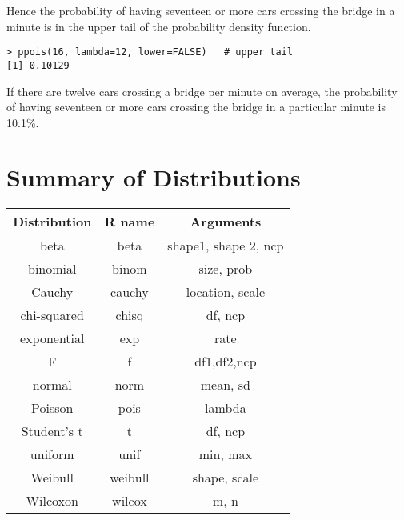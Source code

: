 Hence the probability of having seventeen or more cars crossing the bridge in a minute is in the upper tail of the probability density function. 
\begin{verbatim}
> ppois(16, lambda=12, lower=FALSE)   # upper tail 
[1] 0.10129 
\end{verbatim}

If there are twelve cars crossing a bridge per minute on average, the probability of having seventeen or more cars crossing the bridge in a particular minute is 10.1\%. 







\section{Summary of Distributions}
\begin{center}
\begin{tabular}{|c|c|c|}
\hline
Distribution &	R name & Arguments\\ \hline
beta &	beta &	shape1, shape 2, ncp\\
binomial &	binom	& size, prob\\
Cauchy	& cauchy	& location, scale\\
chi-squared &	chisq &	df, ncp\\
exponential	& exp &	rate\\
F	& f	& df1,df2,ncp\\
normal &	norm &	mean, sd\\
Poisson&	pois & 	lambda\\
Student's t	& t&	df, ncp\\
uniform	& unif &	min, max\\
Weibull	& weibull & shape, scale\\
Wilcoxon &	wilcox &	m, n\\ 
\hline 
\end{tabular}
\end{center}
 
 





